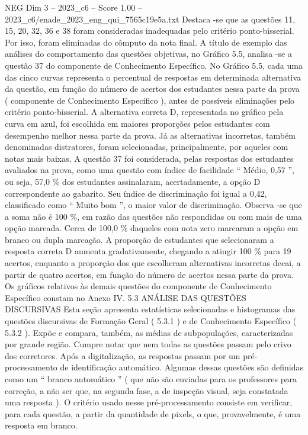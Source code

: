 \begin{textsample}{NEG Dim 3 – 2023\_c6 – Score 1.00 – 2023\_c6/enade\_2023\_eng\_qui\_7565c19e5a.txt}
Destaca -se que as questões 11, 15, 20, 32, 36 e 38 foram consideradas inadequadas pelo critério ponto-bisserial.
Por isso, foram eliminadas do cômputo da nota final.
A título de exemplo das análises do comportamento das questões objetivas, no Gráfico 5.5, analisa -se a questão 37 do componente de Conhecimento Específico.
No Gráfico 5.5, cada uma das cinco curvas representa o percentual de respostas em determinada alternativa da questão, em função do número de acertos dos estudantes nessa parte da prova ( componente de Conhecimento Específico ), antes de possíveis eliminações pelo critério ponto-bisserial.
A alternativa correta D, representada no gráfico pela curva em azul, foi escolhida em maiores proporções pelos estudantes com desempenho melhor nessa parte da prova.
Já as alternativas incorretas, também denominadas distratores, foram selecionadas, principalmente, por aqueles com notas mais baixas.
A questão 37 foi considerada, pelas respostas dos estudantes avaliados na prova, como uma questão com índice de facilidade “ Médio, 0,57 ”, ou seja, 57,0 \% dos estudantes assinalaram, acertadamente, a opção D correspondente ao gabarito.
Seu índice de discriminação foi igual a 0,42, classificado como “ Muito bom ”, o maior valor de discriminação.
Observa -se que a soma não é 100 \%, em razão das questões não respondidas ou com mais de uma opção marcada.
Cerca de 100,0 \% daqueles com nota zero marcaram a opção em branco ou dupla marcação.
A proporção de estudantes que selecionaram a resposta correta D aumenta gradativamente, chegando a atingir 100 \% para 19 acertos, enquanto a proporção dos que escolheram alternativas incorretas decai, a partir de quatro acertos, em função do número de acertos nessa parte da prova.
Os gráficos relativos às demais questões do componente de Conhecimento Específico constam no Anexo IV. 5.3 ANÁLISE DAS QUESTÕES DISCURSIVAS Esta seção apresenta estatísticas selecionadas e histogramas das questões discursivas de Formação Geral ( 5.3.1 ) e de Conhecimento Específico ( 5.3.2 ).
Expõe e compara, também, as médias de subpopulações, caracterizadas por grande região.
Cumpre notar que nem todas as questões passam pelo crivo dos corretores.
Após a digitalização, as respostas passam por um pré-processamento de identificação automático.
Algumas dessas questões são definidas como um “ branco automático ” ( que não são enviadas para os professores para correção, a não ser que, na segunda fase, a de inspeção visual, seja constatada uma resposta ).
O critério usado nesse pré-processamento consiste em verificar, para cada questão, a partir da quantidade de pixels, o que, provavelmente, é uma resposta em branco.

\end{textsample}
